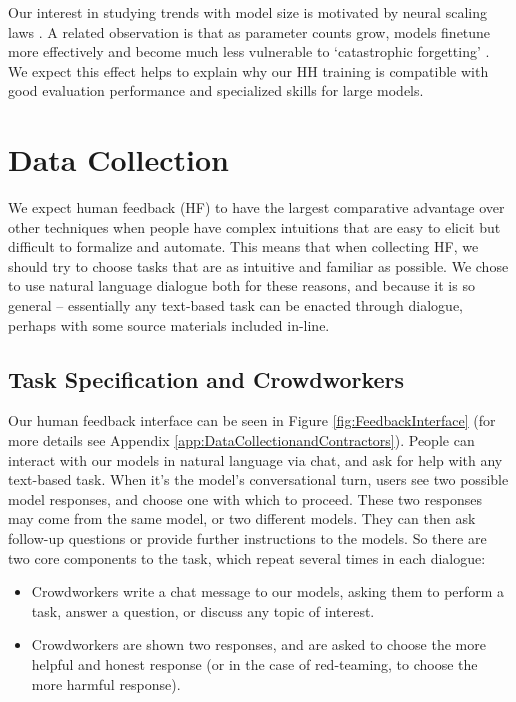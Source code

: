 Our interest in studying trends with model size is motivated by neural scaling laws \cite{Hestness:2019:BHA:3293883.3295710, rosenfeld2019constructive, kaplan2020scaling}.  A related observation is that as parameter counts  grow, models finetune more effectively \cite{ScalingTransfer} and become much less vulnerable to `catastrophic forgetting'  \cite{Forgetting}.  We expect this effect helps to explain why our HH training is compatible with good evaluation performance and specialized skills for large models. 

\section{Data Collection}
\label{sec:DataCollection}

We expect human feedback (HF) to have the largest comparative advantage over other techniques when people have complex intuitions that are easy to elicit but difficult to formalize and automate.  This means that when collecting HF, we should try to choose tasks that are as intuitive and familiar as possible.  We chose to use natural language dialogue both for these reasons, and because it is so general -- essentially any text-based task can be enacted through dialogue, perhaps with some source materials included in-line.  

\subsection{Task Specification and Crowdworkers }

Our human feedback interface can be seen in Figure  \ref{fig:FeedbackInterface} (for more details see Appendix \ref{app:DataCollectionandContractors}).  People can interact with our models in natural language via chat, and ask for help with any text-based task.  When it's the model's conversational turn, users see two possible model responses, and choose one with which to proceed. These two responses may come from the same model, or two different models. They can then ask follow-up questions or provide further instructions to the models.  So there are two core components to the task, which repeat several times in each dialogue:

\begin{itemize}
    \item Crowdworkers write a chat message to our models, asking them to perform a task, answer a question, or discuss any topic of interest.
    \item Crowdworkers are shown two responses, and are asked to choose the more helpful and honest response (or in the case of red-teaming, to choose the more harmful response). 
\end{itemize}

